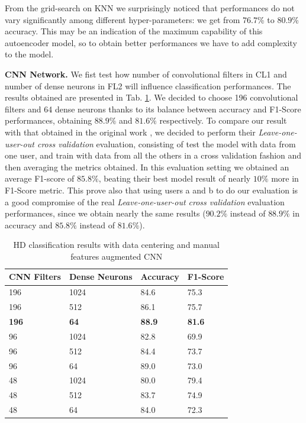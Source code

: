 From the grid-search on KNN we surprisingly noticed that performances
do not vary significantly among different hyper-parameters: we get from
$76.7$\% to $80.9$\% accuracy. This may be an indication of the
maximum capability of this autoencoder model, so to obtain better
performances we have to add complexity to the model.

\textbf{CNN Network.} We fist test how number of convolutional filters in CL1 and number of dense neurons in FL2 will influence classification performances. The results obtained are presented in Tab. \ref{tab:model-selection}. We decided to choose 196 convolutional filters and 64 dense neurons thanks to its balance between accuracy and F1-Score performances, obtaining $88.9\%$ and $81.6\%$ respectively. To compare our result with that obtained in the original work \cite{stisen2015smart}, we decided to perform their \textit{Leave-one-user-out cross validation} evaluation, consisting of test the model with data from one user, and train with data from all the others in a cross validation fashion and then averaging the metrics obtained. In this evaluation setting we obtained an average F1-score of $85.8\%$, beating their best model result of nearly $10\%$ more in F1-Score metric. This prove also that using users a and b to do our evaluation is a good compromise of the real \textit{Leave-one-user-out cross validation} evaluation performances, since we obtain nearly the same results ($90.2\%$ instead of $88.9\%$ in accuracy and $85.8\%$ instead of $81.6\%$).

\begin{table}[h]
	\begin{center}
		\begin{tabular}{ p{1.8cm}p{1.7cm}p{1.7cm}p{1.7cm} }
			\hline
			CNN Filters & Dense Neurons & Accuracy & F1-Score \\
			\hline
			196 & 1024 & 84.6 & 75.3 \\
			196 & 512 & 86.1 & 75.7 \\
			\textbf{196} & \textbf{64} & \textbf{88.9} & \textbf{81.6} \\
			96 & 1024 & 82.8 & 69.9 \\
			96 & 512 & 84.4 & 73.7 \\
			96 & 64 & 89.0 & 73.0 \\
			48 & 1024 & 80.0 & 79.4 \\
			48 & 512 & 83.7 & 74.9 \\
			48 & 64 & 84.0 & 72.3 \\
			\hline
		\end{tabular}
		\caption{\label{tab:model-selection} HD classification results with data centering and manual features augmented CNN}
	\end{center}
\end{table}


